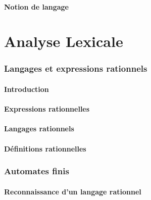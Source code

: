 \subsection{Notion de langage}



 
 
\part{Analyse Lexicale}
 
 
\section{Langages et expressions rationnels}
 
\subsection{Introduction}



 
\subsection{Expressions rationnelles}



 
\subsection{Langages rationnels}




 
\subsection{Définitions rationnelles}


 
\section{Automates finis}
 
\subsection{Reconnaissance d'un langage rationnel}




 
